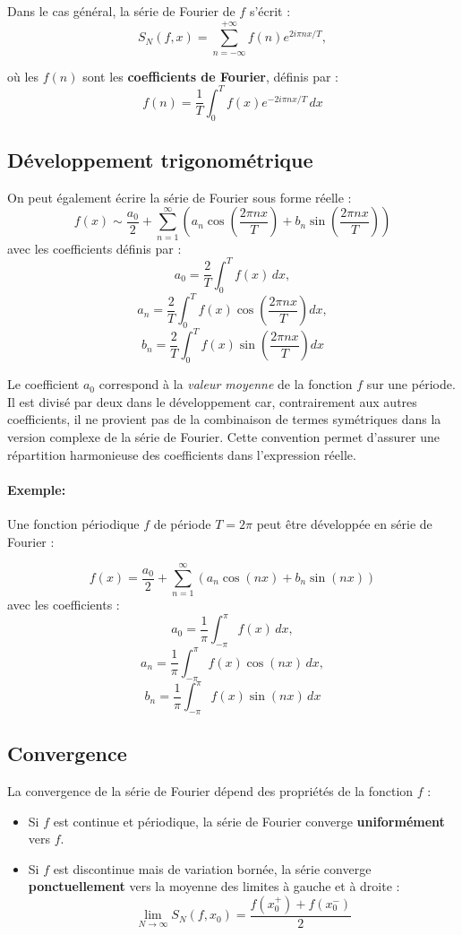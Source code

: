 \documentclass[11pt]{article} %
\begin{document}
\begin{large}
Dans le cas général, la série de Fourier de \( f \) s’écrit :
\[
S_N(f,x) = \sum_{n = -\infty}^{+\infty} {f}(n) e^{2i\pi n x/T},
\]

où les \( {f}(n) \) sont les \textbf{coefficients de Fourier}, définis par :
\[
{f}(n) = \frac{1}{T} \int_{0}^{T} f(x) e^{-2i\pi n x/T} \, dx
\]

\subsection{Développement trigonométrique}


On peut également écrire la série de Fourier sous forme réelle :
\[
f(x) \sim \frac{a_0}{2} + \sum_{n=1}^{\infty} \left( a_n \cos\left(\frac{2\pi n x}{T}\right) + b_n \sin\left(\frac{2\pi n x}{T}\right) \right)
\]
avec les coefficients définis par :
\[
a_0 = \frac{2}{T} \int_0^T f(x)\, dx,
\]
\[
a_n = \frac{2}{T} \int_0^T f(x)\cos\left( \frac{2\pi n x}{T} \right) dx,
\]
\[
b_n = \frac{2}{T} \int_0^T f(x)\sin\left( \frac{2\pi n x}{T} \right) dx
\]

\medskip

Le coefficient \( a_0 \) correspond à la \textit{valeur moyenne} de la fonction \( f \) sur une période. Il est divisé par deux dans le développement car, contrairement aux autres coefficients, il ne provient pas de la combinaison de termes symétriques dans la version complexe de la série de Fourier. Cette convention permet d’assurer une répartition harmonieuse des coefficients dans l’expression réelle.
\]
\paragraph{Exemple:}
Une fonction périodique \( f \) de période \( T = 2\pi \) peut être développée en série de Fourier :

\[
f(x) = \frac{a_0}{2} + \sum_{n=1}^{\infty} \left( a_n \cos\left( nx \right) + b_n \sin\left( nx \right) \right)
\]
avec les coefficients :
\[
a_0 = \frac{1}{\pi} \int_{-\pi}^{\pi} f(x) \, dx,
\]
\[
a_n = \frac{1}{\pi} \int_{-\pi}^{\pi} f(x) \cos(nx) \, dx,
\]
\[
b_n = \frac{1}{\pi} \int_{-\pi}^{\pi} f(x) \sin(nx) \, dx
\]

\subsection{Convergence}

La convergence de la série de Fourier dépend des propriétés de la fonction \( f \) :
\begin{itemize}
  \item Si \( f \) est continue et périodique, la série de Fourier converge \textbf{uniformément} vers \( f \).
  \item Si \( f \) est discontinue mais de variation bornée, la série converge \textbf{ponctuellement} vers la moyenne des limites à gauche et à droite :
  \[
  \lim_{N \to \infty} S_N(f,x_0) = \frac{f(x_0^+) + f(x_0^-)}{2}
  \]
\end{itemize}




\end{large}
\end{document}

